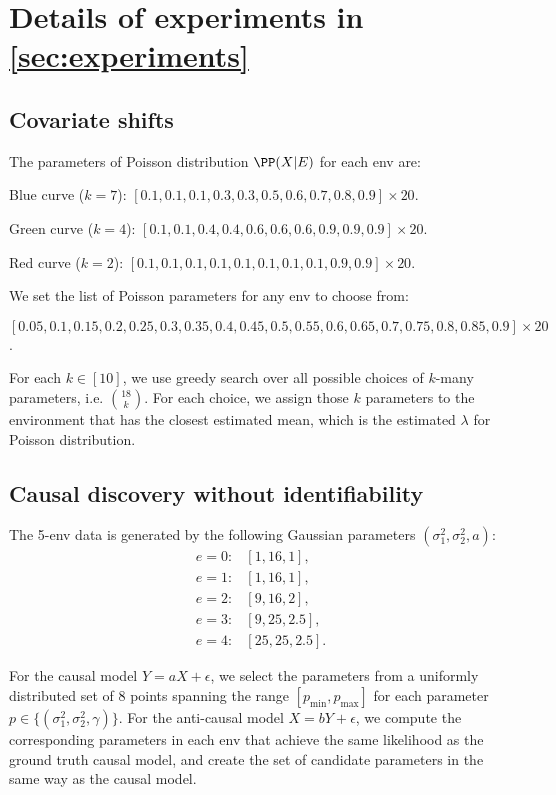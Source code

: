 \section{Details of experiments in \texorpdfstring{\cref{sec:experiments}}{reference}}\label{sec:details_experiments}
\subsection{Covariate shifts}

The parameters of Poisson distribution $\PP(X|E)$ for each env are:

Blue curve ($k=7$):  $[0.1,0.1,0.1,0.3,0.3 ,0.5,0.6,0.7,0.8,0.9]\times 20$.

Green curve ($k=4$): $[0.1,0.1,0.4,0.4,0.6, 0.6,0.6,0.9,0.9,0.9]\times 20$.
 
Red curve ($k=2$): $[0.1,0.1,0.1,0.1,0.1, 0.1,0.1,0.1,0.9,0.9]\times 20$.

We set the list of Poisson parameters for any env to choose from:

$[0.05, 0.1,0.15, 0.2, 0.25, 0.3, 0.35,0.4, 0.45, 0.5, 0.55, 0.6, 0.65,0.7, 0.75, 0.8, 0.85, 0.9]\times 20$.

For each $k\in [10]$, we use greedy search over all possible choices of $k$-many parameters, i.e. $\binom{18}{k}$. For each choice, we assign those $k$ parameters to the environment that has the closest estimated mean, which is the estimated $\lambda$ for Poisson distribution.

\subsection{Causal discovery without identifiability}

The 5-env data is generated by the following Gaussian parameters $(\sigma_1^2,\sigma_2^2,a)$:
\begin{align*}
    e=0:& [1, 16, 1],\\
    e=1:& [1, 16, 1],\\
    e=2:& [9, 16, 2],\\
    e=3:& [9, 25, 2.5],\\
    e=4:& [25, 25, 2.5].
\end{align*}

For the causal model $Y=a X + \epsilon$, we select the parameters from a uniformly distributed set of $8$ points spanning the range $[p_{\text{min}}, p_{\text{max}}]$ for each parameter $p\in\{(\sigma_1^2,\sigma_2^2,\gamma)\}$. For the anti-causal model $X=b Y+\epsilon$, we compute the corresponding parameters in each env that achieve the same likelihood as the ground truth causal model, and create the set of candidate parameters in the same way as the causal model.